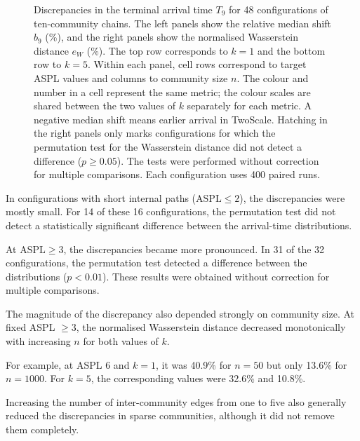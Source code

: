 \documentclass{ieeeaccess}
\newcommand{\TS}{\textup{TwoScale}}
\newcommand{\eW}{e_{W}}
\begin{document}
\begin{figure}[!tbp]
\caption{%
Discrepancies in the terminal arrival time $T_9$ for 48 configurations of ten-community chains.
The left panels show the relative median shift $b_9$ (\%), and the right panels show the normalised Wasserstein distance $\eW$ (\%). The top row corresponds to $k=1$ and the bottom row to $k=5$.
Within each panel, cell rows correspond to target ASPL values and columns to community size $n$.
The colour and number in a cell represent the same metric; the colour scales are shared between the two values of $k$ separately for each metric.
A negative median shift means earlier arrival in \TS{}.
Hatching in the right panels only marks configurations for which the permutation test for the Wasserstein distance did not detect a difference ($p\geq0.05$).
The tests were performed without correction for multiple comparisons.
Each configuration uses 400 paired runs.
}
\label{fig:accuracy_map}
\end{figure}

In configurations with short internal paths ($\mathrm{ASPL}\leq2$), the discrepancies were mostly small. For 14 of these 16 configurations, the permutation test did not detect a statistically significant difference between the arrival-time distributions.

At $\mathrm{ASPL}\geq3$, the discrepancies became more pronounced. In 31 of the 32 configurations, the permutation test detected a difference between the distributions ($p<0.01$). These results were obtained without correction for multiple comparisons.

The magnitude of the discrepancy also depended strongly on community size. At fixed ASPL $\geq3$, the normalised Wasserstein distance decreased monotonically with increasing $n$ for both values of $k$.

For example, at ASPL 6 and $k=1$, it was 40.9\% for $n=50$ but only 13.6\% for $n=1000$. For $k=5$, the corresponding values were 32.6\% and 10.8\%.

Increasing the number of inter-community edges from one to five also generally reduced the discrepancies in sparse communities, although it did not remove them completely.
\end{document}
